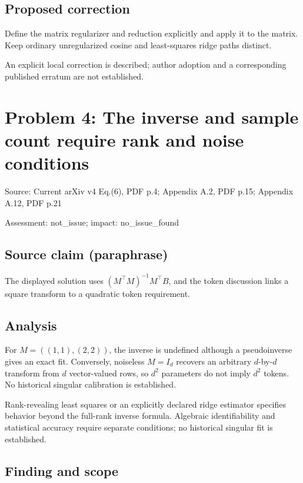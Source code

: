 \documentclass[11pt]{article}
\begin{document}
\subsection*{Proposed correction}

Define the matrix regularizer and reduction explicitly and apply it to the matrix. Keep ordinary unregularized cosine and least-squares ridge paths distinct.

An explicit local correction is described; author adoption and a corresponding published erratum are not established.

\section*{Problem 4: The inverse and sample count require rank and noise conditions}

Source: Current arXiv v4 Eq.(6), PDF p.4; Appendix A.2, PDF p.15; Appendix A.12, PDF p.21

Assessment: not\_issue; impact: no\_issue\_found

\subsection*{Source claim (paraphrase)}

The displayed solution uses \((M^\top M)^{-1}M^\top B\), and the token discussion links a square transform to a quadratic token requirement.

\subsection*{Analysis}

For \(M=((1,1),(2,2))\), the inverse is undefined although a pseudoinverse gives an exact fit. Conversely, noiseless \(M=I_d\) recovers an arbitrary \(d\)-by-\(d\) transform from \(d\) vector-valued rows, so \(d^2\) parameters do not imply \(d^2\) tokens. No historical singular calibration is established.

Rank-revealing least squares or an explicitly declared ridge estimator specifies behavior beyond the full-rank inverse formula. Algebraic identifiability and statistical accuracy require separate conditions; no historical singular fit is established.

\subsection*{Finding and scope}
\end{document}
